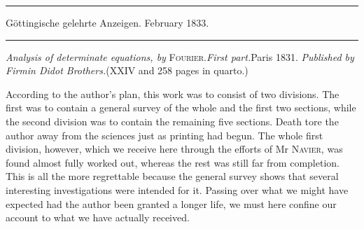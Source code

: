 \clearpage
{}
\begin{center}
\rule{0.55\linewidth}{0.4pt}\par Göttingische gelehrte Anzeigen. February 1833.\par \rule{0.55\linewidth}{0.4pt}
\end{center}
\textit{Analysis of determinate equations, by} \textsc{Fourier}.\quad\textit{First part.}\quad Paris 1831. \textit{Published by Firmin Didot Brothers.}\quad (XXIV and 258 pages in quarto.)

According to the author's plan, this work was to consist of two divisions. The first was to contain a general survey of the whole and the first two sections, while the second division was to contain the remaining five sections. Death tore the author away from the sciences just as printing had begun. The whole first division, however, which we receive here through the efforts of Mr \textsc{Navier}, was found almost fully worked out, whereas the rest was still far from completion. This is all the more regrettable because the general survey shows that several interesting investigations were intended for it. Passing over what we might have expected had the author been granted a longer life, we must here confine our account to what we have actually received.

